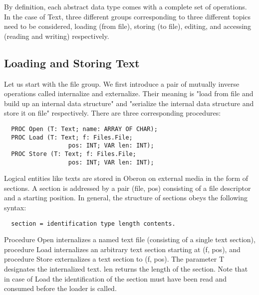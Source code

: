 By definition, each abstract data type comes with a complete set of operations. In the case of Text,
three different groups corresponding to three different topics need to be considered, loading (from
file), storing (to file), editing, and accessing (reading and writing) respectively.

\subsection{Loading and Storing Text}
Let us start with the file group. We first introduce a pair of mutually inverse operations called
internalize and externalize. Their meaning is "load from file and build up an internal data structure"
and "serialize the internal data structure and store it on file" respectively. There are three
corresponding procedures:
\begin{verbatim}
  PROC Open (T: Text; name: ARRAY OF CHAR);
  PROC Load (T: Text; f: Files.File;
                  pos: INT; VAR len: INT);
  PROC Store (T: Text; f: Files.File;
                  pos: INT; VAR len: INT);
\end{verbatim}
Logical entities like texts are stored in Oberon on external media in the form of sections. A section
is addressed by a pair (file, pos) consisting of a file descriptor and a starting position. In general, the
structure of sections obeys the following syntax:
\begin{verbatim}
  section = identification type length contents.
\end{verbatim}

Procedure Open internalizes a named text file (consisting of a single text section), procedure Load
internalizes an arbitrary text section starting at (f, pos), and procedure Store externalizes a text
section to (f, pos). The parameter T designates the internalized text. len returns the length of the
section. Note that in case of Load the identification of the section must have been read and
consumed before the loader is called.

